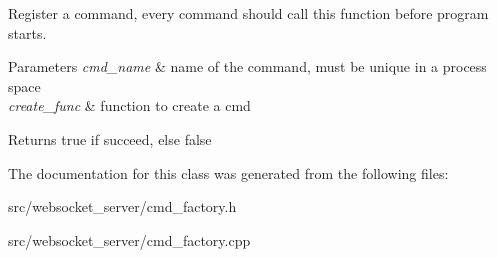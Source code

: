 Register a command, every command should call this function before program starts. 


\begin{DoxyParams}{Parameters}
{\em cmd\+\_\+name} & name of the command, must be unique in a process space \\
\hline
{\em create\+\_\+func} & function to create a cmd \\
\hline
\end{DoxyParams}
\begin{DoxyReturn}{Returns}
true if succeed, else false 
\end{DoxyReturn}


The documentation for this class was generated from the following files\+:\begin{DoxyCompactItemize}
\item 
src/websocket\+\_\+server/cmd\+\_\+factory.\+h\item 
src/websocket\+\_\+server/cmd\+\_\+factory.\+cpp\end{DoxyCompactItemize}
